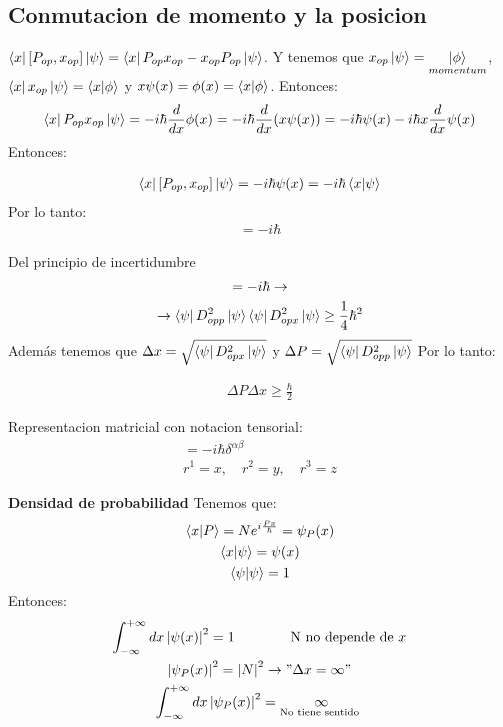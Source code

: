 \documentclass{article}
\newcommand{\caja}[3]{%
  \begin{tcolorbox}[colback=#1!5!white,colframe=#1!25!black,title=#2]
    #3
  \end{tcolorbox}%
}
\begin{document}
\subsection{Conmutacion de momento y la posicion }
$ \bra{x}[P _{op } , x _{op } ]\ket{\psi} = \bra{x}P _{op } x _{op } - x _{op } P _{op } \ket{\psi}   $. Y tenemos que $ x _{op } \ket{\psi } = \underset{momentum }{\ket{ \phi }} $, $ \bra{x }x _{op } \ket{\psi} = \bra{x }\ket{\phi}   $ y $ x \psi (x) = \phi (x) = \bra{x}\ket{\phi}  $. Entonces: 
\begin{gather}
  \bra{x }P _{op } x _{op } \ket{\psi} = -i \hbar \frac{d }{dx }\phi(x) = -i \hbar \frac{d }{dx }(x \psi (x)) = -i \hbar \psi (x)- i \hbar x \frac{d}{dx }\psi (x) 
\end{gather}
Entonces: 
\caja{red}{}{
  \begin{gather}
    \bra{x }[P _{op } , x _{op } ]\ket{\psi} = - i \hbar \psi(x) = - i \hbar \bra{x}\ket{\psi}   
  \end{gather}
  Por lo tanto: 
  \begin{gather}
    [P _{op } , x _{op } ] = -i \hbar  
  \end{gather}
}
Del principio de incertidumbre
\begin{gather}
  [P _{op } , x _{op } ] = -i \hbar  \rightarrow \\
  \rightarrow \bra{\psi}D _{opp} ^ {2 }\ket{\psi}\bra{\psi}D _{opx } ^ {2}\ket{\psi}\geq \frac{1}{4} \hbar ^ {2 }  
\end{gather}
Además tenemos que $ \Delta x = \sqrt{\bra{\psi}D _{opx } ^ {2 }\ket{\psi} }   $ y $ \Delta P = \sqrt{\bra{\psi}D _{opp } ^ {2 }\ket{\psi} }  $ Por lo tanto: 
\caja{red}{}{
  \begin{gather}
    \Delta P \Delta x \geq \frac{\hbar }{2}
  \end{gather}
}
Representacion matricial con notacion tensorial: 
\begin{gather}
  [P _{op } ^ {\alpha }, r _{op } ^ {\beta}] = -i \hbar \delta ^ {\alpha \beta}\\
  r ^ {1 } =x, \quad r ^ {2 } = y, \quad r ^ {3 } = z 
\end{gather}

\textbf{Densidad de probabilidad }
Tenemos que: 
\begin{gather}
  \bra{x }\ket{P } = N e ^ {i \frac{P x }{\hbar }} = \psi _{P } (x)\\
  \bra{x }\ket{\psi} = \psi (x)\\
  \bra{\psi}\ket{\psi} = 1  
\end{gather}
Entonces: 
\begin{gather}
  \int_{- \infty}^{+ \infty} dx \left|\psi (x)\right|^ {2 } = 1 \qquad \qquad \text{N no depende de }x\\
  \left|\psi _{P } (x)\right|^ {2 } = \left|N \right|^ {2 } \rightarrow "\Delta x  = \infty"\\
  \int_{- \infty}^{+ \infty}dx \left|\psi _P (x) \right|^ {2 } = \underset{\text{No tiene sentido }}{\infty}
\end{gather}
\end{document}
